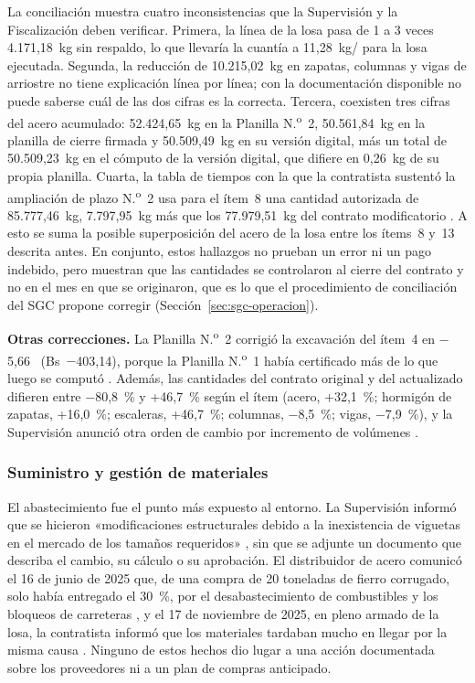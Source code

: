 La conciliación muestra cuatro inconsistencias que la Supervisión y la Fiscalización deben verificar. Primera, la línea de la losa pasa de 1 a 3 veces 4.171,18~kg sin respaldo, lo que llevaría la cuantía a 11,28~kg/\mdos{} para la losa ejecutada. Segunda, la reducción de 10.215,02~kg en zapatas, columnas y vigas de arriostre no tiene explicación línea por línea; con la documentación disponible no puede saberse cuál de las dos cifras es la correcta. Tercera, coexisten tres cifras del acero acumulado: 52.424,65~kg en la Planilla N.\textsuperscript{o}~2, 50.561,84~kg en la planilla de cierre firmada y 50.509,49~kg en su versión digital, más un total de 50.509,23~kg en el cómputo de la versión digital, que difiere en 0,26~kg de su propia planilla. Cuarta, la tabla de tiempos con la que la contratista sustentó la ampliación de plazo N.\textsuperscript{o}~2 usa para el ítem~8 una cantidad autorizada de 85.777,46~kg, 7.797,95~kg más que los 77.979,51~kg del contrato modificatorio \parencite[pp.~17, 25]{uatf_item13}. A esto se suma la posible superposición del acero de la losa entre los ítems~8 y~13 descrita antes. En conjunto, estos hallazgos no prueban un error ni un pago indebido, pero muestran que las cantidades se controlaron al cierre del contrato y no en el mes en que se originaron, que es lo que el procedimiento de conciliación del SGC propone corregir (Sección~\ref{sec:sgc-operacion}).

\textbf{Otras correcciones.} La Planilla N.\textsuperscript{o}~2 corrigió la excavación del ítem~4 en $-$5,66~\mtres{} (Bs~$-$403,14), porque la Planilla N.\textsuperscript{o}~1 había certificado más de lo que luego se computó \parencite[pp.~16, 18]{uatf2025pao2}. Además, las cantidades del contrato original y del actualizado difieren entre $-$80,8~\% y +46,7~\% según el ítem (acero, +32,1~\%; hormigón de zapatas, +16,0~\%; escaleras, +46,7~\%; columnas, $-$8,5~\%; vigas, $-$7,9~\%), y la Supervisión anunció otra orden de cambio por incremento de volúmenes \parencite[pp.~11, 16]{uatf2025pao2}.

\subsubsection{Suministro y gestión de materiales}
El abastecimiento fue el punto más expuesto al entorno. La Supervisión informó que se hicieron «modificaciones estructurales debido a la inexistencia de viguetas en el mercado de los tamaños requeridos» \parencite[p.~11]{uatf2025pao2}, sin que se adjunte un documento que describa el cambio, su cálculo o su aprobación. El distribuidor de acero comunicó el 16 de junio de 2025 que, de una compra de 20 toneladas de fierro corrugado, solo había entregado el 30~\%, por el desabastecimiento de combustibles y los bloqueos de carreteras \parencite{laslomas2025}, y el 17 de noviembre de 2025, en pleno armado de la losa, la contratista informó que los materiales tardaban mucho en llegar por la misma causa \parencite[p.~123]{uatf2025pao2}. Ninguno de estos hechos dio lugar a una acción documentada sobre los proveedores ni a un plan de compras anticipado.

